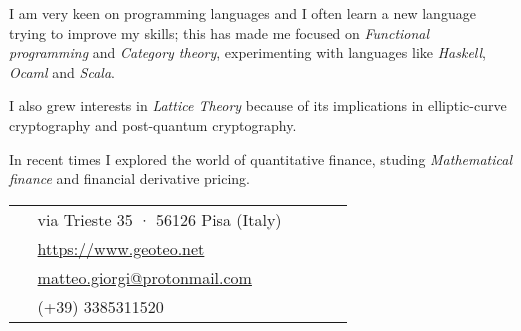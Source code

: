 \documentclass[10pt]{article} %
\begin{document}
\begin{paracol}{2}
I am very keen on programming languages and I often learn a new language trying to improve my skills; this has made me focused on \textit{Functional programming} and \textit{Category theory}, experimenting with languages like \textit{Haskell}, \textit{Ocaml} and \textit{Scala}.

\medskip
I also grew interests in \textit{Lattice Theory} because of its implications in elliptic-curve cryptography and post-quantum cryptography.

\medskip
In recent times I explored the world of quantitative finance, studing \textit{Mathematical finance} and financial derivative pricing.





\switchcolumn %


\parbox[top][0.12\textheight][c]{\linewidth}{ %
	\vspace{-0.04\textheight} %
	\colorbox{shade}{ %
		\begin{supertabular}{p{0.05\linewidth}|p{0.775\linewidth}} %
			\raisebox{-1pt}{\faHome} & via Trieste 35 · 56126 Pisa (Italy) \\ %
			\raisebox{-1pt}{\small\faDesktop} & \href{https://www.geoteo.net}{https://www.geoteo.net} \\ %
			\raisebox{0pt}{\small\faEnvelope} & \href{mailto:matteo.giorgi@protonmail.com}{matteo.giorgi@protonmail.com} \\ %
			\raisebox{-1pt}{\faPhoneSquare} & (+39) 3385311520 \\ %
		\end{supertabular}
	}
}


\end{paracol}
\end{document}
